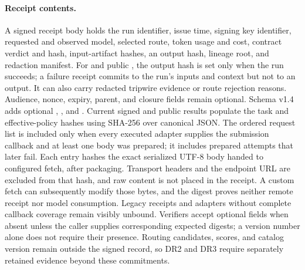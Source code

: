 \paragraph{Receipt contents.} A signed receipt body holds the run identifier, issue time, signing key identifier, requested and observed model, selected route, token usage and cost, contract verdict and hash, input-artifact hashes, an output hash, lineage root, and redaction manifest. For  and public , the output hash is set only when the run succeeds; a failure receipt commits to the run's inputs and context but not to an output. It can also carry redacted tripwire evidence or route rejection reasons. Audience, nonce, expiry, parent, and closure fields remain optional. Schema v1.4 adds optional , , and . Current signed  and public  results populate the task and effective-policy hashes using SHA-256 over canonical JSON. The ordered request list is included only when every executed adapter supplies the submission callback and at least one body was prepared; it includes prepared attempts that later fail. Each entry hashes the exact serialized UTF-8 body handed to configured fetch, after packaging. Transport headers and the endpoint URL are excluded from that hash, and raw content is not placed in the receipt. A custom fetch can subsequently modify those bytes, and the digest proves neither remote receipt nor model consumption. Legacy receipts and adapters without complete callback coverage remain visibly unbound. Verifiers accept optional fields when absent unless the caller supplies corresponding expected digests; a version number alone does not require their presence. Routing candidates, scores, and catalog version remain outside the signed record, so DR2 and DR3 require separately retained evidence beyond these commitments.

